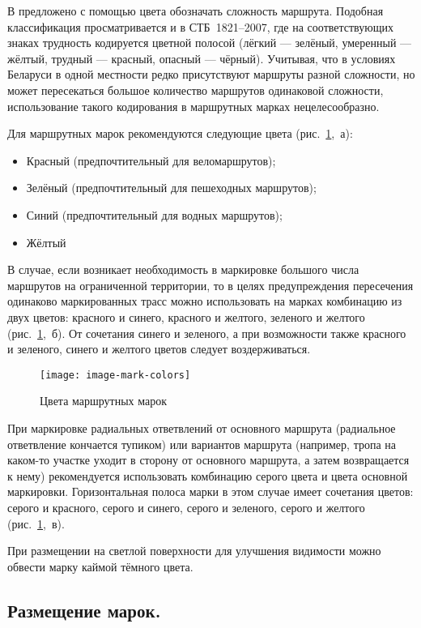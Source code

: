 \documentclass[a4paper,12pt]{extarticle}
\begin{document}
В \cite{metodussr} предложено с помощью цвета обозначать сложность маршрута. Подобная классификация просматривается и в
СТБ~1821--2007, где на соответствующих знаках трудность кодируется цветной полосой  (лёгкий --- зелёный, умеренный ---
жёлтый, трудный --- красный, опасный --- чёрный). Учитывая, что в условиях Беларуси в одной местности редко присутствуют
маршруты разной сложности, но может пересекаться большое количество маршрутов одинаковой сложности, использование такого
кодирования в маршрутных марках нецелесообразно.

Для маршрутных марок рекомендуются следующие цвета (рис.~\ref{fig:mark-colors},~а):
\begin{itemize}
	\item Красный (предпочтительный для веломаршрутов);
	\item Зелёный (предпочтительный для пешеходных маршрутов);
	\item Синий (предпочтительный для водных маршрутов);
	\item Жёлтый
\end{itemize}

В случае, если возникает необходимость в маркировке большого числа маршрутов на ограниченной территории, то в целях
предупреждения пересечения одинаково маркированных трасс можно использовать на марках комбинацию из двух цветов:
красного и синего, красного и желтого, зеленого и желтого (рис.~\ref{fig:mark-colors},~б). От сочетания синего и зеленого, а при возможности
также красного и зеленого, синего и желтого цветов следует воздерживаться.

\begin{figure}[ht]
	\centering
	\texttt{[image: image-mark-colors]}
	\caption{Цвета маршрутных марок}\label{fig:mark-colors}
\end{figure}


При маркировке радиальных ответвлений от основного маршрута (радиальное ответвление кончается тупиком) или вариантов
маршрута (например, тропа на каком-то участке уходит в сторону от основного маршрута, а затем возвращается к нему)
рекомендуется использовать комбинацию серого цвета и цвета основной маркировки. Горизонтальная полоса  марки в этом
случае имеет сочетания цветов: серого и красного, серого и синего, серого и зеленого, серого и желтого (рис.~\ref{fig:mark-colors},~в).

При размещении на светлой поверхности для улучшения видимости можно обвести марку каймой тёмного цвета.

\subsection{Размещение марок.}
\end{document}
